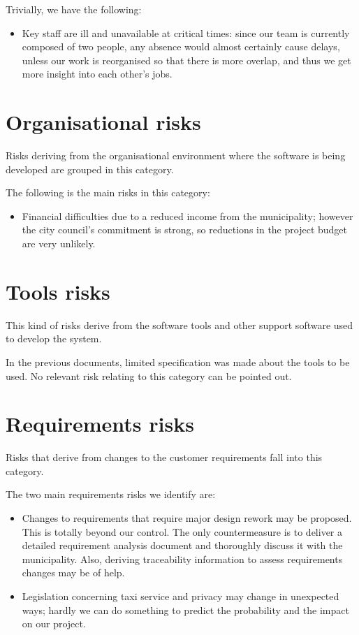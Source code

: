 Trivially, we have the following:
\begin{itemize}
	\item Key staff are ill and unavailable at critical times: since our team is currently composed of two people, any absence would almost certainly cause delays, unless our work is reorganised so that there is more overlap, and thus we get more insight into each other's jobs.
\end{itemize}





\section{Organisational risks}

Risks deriving from the organisational environment where the software is being developed are grouped in this category.

The following is the main risks in this category:
\begin{itemize}
	\item Financial difficulties due to a reduced income from the municipality; however the city council's commitment is strong, so reductions in the project budget are very unlikely.
\end{itemize}






\section{Tools risks}

This kind of risks derive from the software tools and other support software used to develop the system.

In the previous documents, limited specification was made about the tools to be used. No relevant risk relating to this category can be pointed out.




\section{Requirements risks}

Risks that derive from changes to the customer requirements fall into this category.

The two main requirements risks we identify are:
\begin{itemize}
	\item Changes to requirements that require major design rework may be proposed. This is totally beyond our control. The only countermeasure is to deliver a detailed requirement analysis document and thoroughly discuss it with the municipality. Also, deriving traceability information to assess requirements changes may be of help.
	\item Legislation concerning taxi service and privacy may change in unexpected ways; hardly we can do something to predict the probability and the impact on our project.
\end{itemize}


